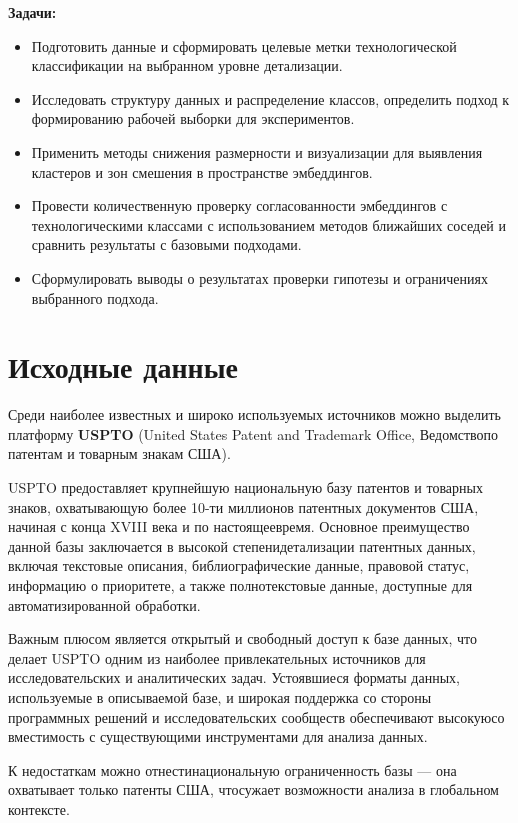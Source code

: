 \documentclass{article}
\begin{document}
\textbf{Задачи:}
\begin{itemize}
  \item Подготовить данные и сформировать целевые метки технологической классификации на выбранном уровне детализации.
  \item Исследовать структуру данных и распределение классов, определить подход к формированию рабочей выборки для экспериментов.
  \item Применить методы снижения размерности и визуализации для выявления кластеров и зон смешения в пространстве эмбеддингов.
  \item Провести количественную проверку согласованности эмбеддингов с технологическими классами с использованием методов ближайших соседей и сравнить результаты с базовыми подходами.
  \item Сформулировать выводы о результатах проверки гипотезы и ограничениях выбранного подхода.
\end{itemize}


\newpage
\section{Исходные данные}
Среди наиболее известных и широко используемых источников можно выделить платформу \textbf{USPTO} (United States Patent and Trademark Office, Ведомствопо патентам и товарным знакам США).

USPTO предоставляет крупнейшую национальную базу патентов и товарных знаков, охватывающую более 10-ти миллионов патентных документов США, начиная с конца XVIII века и по настоящеевремя. Основное преимущество данной базы заключается в высокой степенидетализации патентных данных, включая текстовые описания, библиографические данные, правовой статус, информацию о приоритете, а также полнотекстовые данные, доступные для автоматизированной обработки. 

Важным плюсом является открытый и свободный доступ к базе данных, что делает USPTO одним из наиболее привлекательных источников для исследовательских и аналитических задач. Устоявшиеся форматы данных, используемые в описываемой базе, и широкая поддержка со стороны программных решений и исследовательских сообществ обеспечивают высокуюсо вместимость с существующими инструментами для анализа данных. 

К недостаткам можно отнестинациональную ограниченность базы — она охватывает только патенты США, чтосужает возможности анализа в глобальном контексте.
\end{document}
